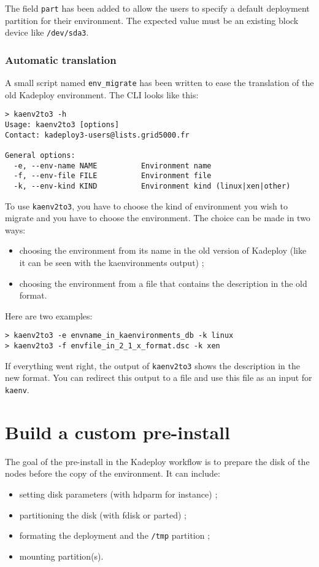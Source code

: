 \documentclass[a4wide,10pt,oneside]{book}
\begin{document}
The field \texttt{part} has been added to allow the users to specify a default deployment partition for their environment. The expected value must be an existing block device like \texttt{/dev/sda3}.

\subsubsection{Automatic translation}
A small script named \texttt{env\_migrate} has been written to ease the translation of the old Kadeploy environment. The CLI looks like this:

\begin{small}
\begin{verbatim}
> kaenv2to3 -h
Usage: kaenv2to3 [options]
Contact: kadeploy3-users@lists.grid5000.fr

General options:
  -e, --env-name NAME          Environment name
  -f, --env-file FILE          Environment file
  -k, --env-kind KIND          Environment kind (linux|xen|other)
\end{verbatim}
\end{small}

To use \texttt{kaenv2to3}, you have to choose the kind of environment you wish to migrate and you have to choose the environment. The choice can be made in two ways:
\begin{itemize}
\item choosing the environment from its name in the old version of Kadeploy (like it can be seen with the kaenvironments output) ;
\item choosing the environment from a file that contains the description in the old format.
\end{itemize}

Here are two examples:
\begin{small}
\begin{verbatim}
> kaenv2to3 -e envname_in_kaenvironments_db -k linux
> kaenv2to3 -f envfile_in_2_1_x_format.dsc -k xen
\end{verbatim}
\end{small}

If everything went right, the output of \texttt{kaenv2to3} shows the description in the new format. You can redirect this output to a file and use this file as an input for \texttt{kaenv}.

\section{Build a custom pre-install}\label{sec:custom-preinstall}
The goal of the pre-install in the Kadeploy workflow is to prepare the disk of the nodes before the copy of the environment. It can include:
\begin{itemize}
\item setting disk parameters (with hdparm for instance) ;
\item partitioning the disk (with fdisk or parted) ;
\item formating the deployment and the \texttt{/tmp} partition ;
\item mounting partition(s).
\end{itemize}
\end{document}

